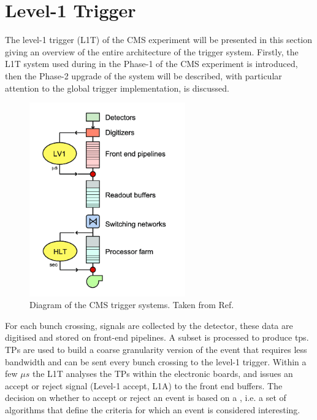 \documentclass[../../main.tex]{subfiles}
\begin{document}
\section{Level-1 Trigger}
\label{sec:L1T}

The level-1 trigger (L1T) of the CMS experiment will be presented in this section giving an overview of the entire architecture of the trigger system. Firstly, the L1T system used during in the
Phase-1 of the CMS experiment is introduced, then the Phase-2 upgrade of the system will be described, with particular attention to the global trigger implementation, is discussed.  

\begin{figure}[h]
    \centering
    \includegraphics[width=0.6\textwidth]{sections/02/Images/L1T_scheme.png}
    \caption{Diagram of the CMS trigger systems. Taken from Ref. \cite{L1T}}
    \label{fig:L1T_diagram}
\end{figure}

For each bunch crossing, signals are collected by the detector, these data are digitised and stored on front-end pipelines. A subset is processed to produce \acrfull{tps}. TPs are used to build a coarse granularity version of the event that requires less bandwidth and can be sent every bunch crossing to the level-1 trigger. Within a
few $\mu s$ the L1T analyses the TPs within the electronic boards, and issues an accept or reject signal (Level-1 accept, L1A) to the front end buffers. The decision on whether to accept or reject an event is based on a , i.e. a set of algorithms that define the criteria for which an event is considered interesting.  
\end{document}
